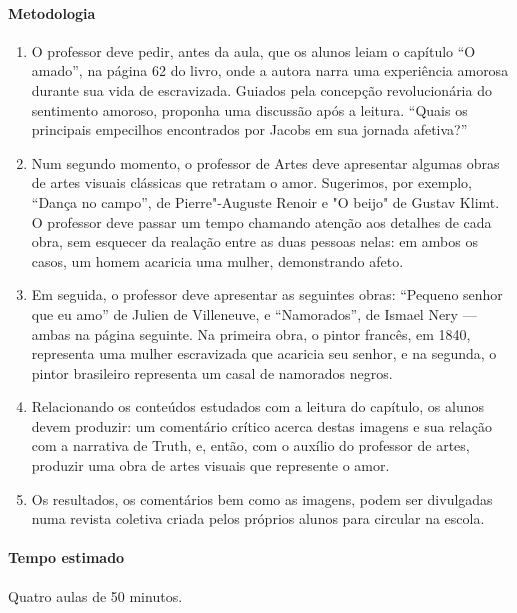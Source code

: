 \documentclass[11pt]{extarticle}
\begin{document}
 \paragraph{Metodologia}
   \begin{enumerate}
    \item
      O professor deve pedir, antes da aula, que os alunos leiam o capítulo ``O amado'', 
    na página 62 do livro, onde a autora narra uma experiência amorosa durante 
    sua vida de escravizada. Guiados pela concepção revolucionária do sentimento 
    amoroso, proponha uma discussão após a leitura. 
    ``Quais os principais empecilhos encontrados por Jacobs em sua jornada afetiva?''

    \item
    Num segundo momento, o professor de Artes deve apresentar algumas obras
    de artes visuais clássicas que retratam o amor. Sugerimos, por exemplo,
    ``Dança no campo'', de Pierre"-Auguste Renoir e "O beijo" de Gustav Klimt.
    O professor deve passar um tempo chamando atenção aos detalhes de cada 
    obra, sem esquecer da realação entre as duas pessoas nelas: em ambos
    os casos, um homem acaricia uma mulher, demonstrando afeto.

    \item
    Em seguida, o professor deve apresentar as seguintes obras: 
    ``Pequeno senhor que eu amo'' de Julien de Villeneuve, e ``Namorados'',
    de Ismael Nery --- ambas na página seguinte. Na primeira obra, o pintor francês, em 1840, representa 
    uma mulher escravizada que acaricia seu senhor, e na segunda, o pintor 
    brasileiro representa um casal de namorados negros. 

    \item
    Relacionando os conteúdos estudados com a leitura do capítulo, 
    os alunos devem produzir: um comentário crítico acerca destas imagens 
    e sua relação com a narrativa de Truth, e, então, com o auxílio do
    professor de artes, produzir uma obra de artes visuais que represente o amor. 

    \item
    Os resultados, os comentários bem como as imagens, podem ser divulgadas
    numa revista coletiva criada pelos próprios alunos para circular na escola. 
\end{enumerate}

 \paragraph{Tempo estimado} Quatro aulas de 50 minutos.
\end{document}
